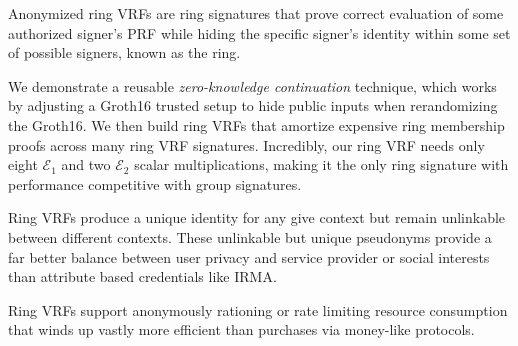 \def\eprintsmallskip{\smallskip}{}%
%
Anonymized ring VRFs are ring signatures that prove correct evaluation
of some authorized signer's PRF while hiding the specific signer's
identity within some set of possible signers, known as the ring.

\eprintsmallskip
We demonstrate a reusable {\em zero-knowledge continuation} technique,
which works by adjusting a Groth16 trusted setup to hide public inputs
when rerandomizing the Groth16.  We then build ring VRFs that amortize
expensive ring membership proofs across many ring VRF signatures.
%
Incredibly, our ring VRF needs only eight $\mathcal{E}_1$ and two
$\mathcal{E}_2$ scalar multiplications, making it the only ring signature
with performance competitive with group signatures.

\eprintsmallskip
Ring VRFs produce a unique identity for any give context but remain
unlinkable between different contexts.  These unlinkable but unique
pseudonyms provide a far better balance between user privacy and service
provider or social interests than attribute based credentials like IRMA.

\eprintsmallskip
Ring VRFs support anonymously rationing or rate limiting resource
consumption that winds up vastly more efficient than purchases via money-like protocols.
